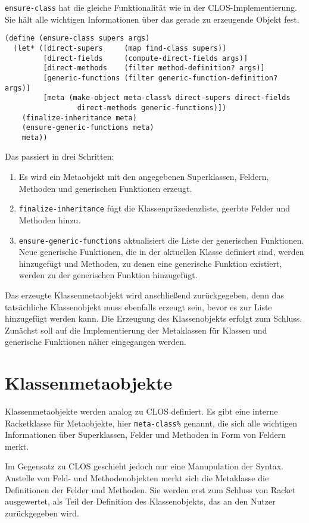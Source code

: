 \texttt{ensure-class} hat die gleiche Funktionalität wie in der CLOS-Implementierung. Sie hält alle wichtigen Informationen über das gerade zu erzeugende Objekt fest. 

\begin{lstlisting}
(define (ensure-class supers args)
  (let* ([direct-supers     (map find-class supers)]  
         [direct-fields     (compute-direct-fields args)]
         [direct-methods    (filter method-definition? args)]
         [generic-functions (filter generic-function-definition? args)]
         [meta (make-object meta-class% direct-supers direct-fields
                 direct-methods generic-functions)])
    (finalize-inheritance meta)
    (ensure-generic-functions meta)
    meta))
\end{lstlisting}


Das passiert in drei Schritten:
\begin{enumerate}
 \item Es wird ein Metaobjekt mit den angegebenen Superklassen, Feldern, Methoden und generischen Funktionen erzeugt.
 \item \texttt{finalize-inheritance} fügt die Klassenpräzedenzliste, geerbte Felder und Methoden hinzu.
 \item \texttt{ensure-generic-functions} aktualisiert die Liste der generischen Funktionen. Neue generische Funktionen, die in der aktuellen Klasse definiert sind, werden hinzugefügt und Methoden, zu denen eine generische Funktion existiert, werden zu der generischen Funktion hinzugefügt.
\end{enumerate}

Das erzeugte Klassenmetaobjekt wird anschließend zurückgegeben, denn das tatsächliche Klassenobjekt muss ebenfalls erzeugt sein, bevor es zur Liste hinzugefügt werden kann. Die Erzeugung des Klassenobjekts erfolgt zum Schluss. Zunächst soll auf die Implementierung der Metaklassen für Klassen und generische Funktionen näher eingegangen werden.

\section{Klassenmetaobjekte}
Klassenmetaobjekte werden analog zu CLOS definiert. Es gibt eine interne Racketklasse für Metaobjekte, hier \texttt{meta-class\%} genannt, die sich alle wichtigen Informationen über Superklassen, Felder und Methoden in Form von Feldern merkt.

Im Gegensatz zu CLOS geschieht jedoch nur eine Manupulation der Syntax. Anstelle von Feld- und Methodenobjekten merkt sich die Metaklasse die Definitionen der Felder und Methoden. Sie werden erst zum Schluss von Racket ausgewertet, als Teil der Definition des Klassenobjekts, das an den Nutzer zurückgegeben wird.

